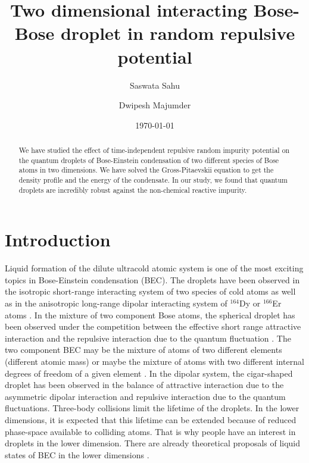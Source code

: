 \documentclass[amsmath,amssymb,lengthcheck,aps,prl] {revtex4}
\begin{document}
  \title{Two dimensional interacting Bose-Bose droplet in random repulsive potential}

\author{Saswata Sahu}
 \author{ Dwipesh Majumder }
\date{\today}


\begin{abstract}
 We have studied the effect of time-independent repulsive random impurity potential on the quantum droplets of Bose-Einstein condensation of two different species of Bose atoms in two dimensions. We have solved the Gross-Pitaevskii equation to get the density profile and the energy of the condensate. In our study, we found that quantum droplets are incredibly robust against the non-chemical reactive impurity.
\end{abstract}
\maketitle
\section{Introduction}


Liquid formation of the dilute ultracold atomic system \cite{Petrov2015,Trarruell2018}  is one of the most exciting topics in Bose-Einstein condensation (BEC).
The droplets have been observed in the isotropic short-range interacting system of two species of cold atoms \cite{Trarruell2018,drop_exp2, Trarruell2018PRL} as well as in the anisotropic long-range dipolar interacting system of $^{164}$Dy or $^{166}$Er atoms \cite{dipolar_droplets}. 
In the mixture of two component Bose atoms, the spherical droplet has been observed under the competition between the effective short range attractive interaction and the repulsive interaction due to the quantum fluctuation \cite{LHY}.
The two component BEC may be the mixture of atoms of two different elements (different atomic mass) \cite{PRL89, PRL100,Itali2020} or maybe the mixture of atoms with two different internal degrees of freedom of a given element \cite{spin_BEC, PRL'101, 2Comp_BEC}. 
 In the dipolar system, the cigar-shaped droplet has been observed in the balance of attractive interaction due to the asymmetric dipolar interaction and repulsive interaction due to the quantum fluctuations.  Three-body collisions limit the lifetime of the droplets. In the lower dimensions, it is expected that this lifetime can be extended because of reduced phase-space available to colliding atoms. That is why people have an interest in droplets in the lower dimension.
There are already theoretical proposals of liquid states of BEC in the lower dimensions \cite{2D_liquid,2D_liquid1, 2D_liquid2,2D_liquid3, Gajda19, SS2020}.
\end{document}
